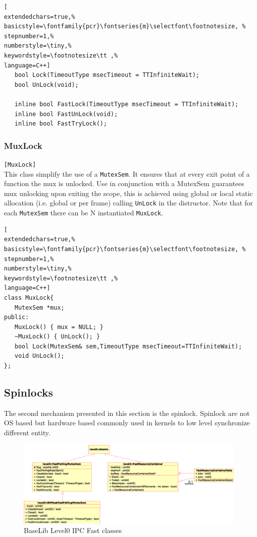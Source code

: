 \begin{lstlisting}[
extendedchars=true,%
basicstyle=\fontfamily{pcr}\fontseries{m}\selectfont\footnotesize, %
stepnumber=1,%
numberstyle=\tiny,%
keywordstyle=\footnotesize\tt ,%
language=C++]
   bool Lock(TimeoutType msecTimeout = TTInfiniteWait);
   bool UnLock(void);

   inline bool FastLock(TimeoutType msecTimeout = TTInfiniteWait);
   inline bool FastUnLock(void);
   inline bool FastTryLock();
\end{lstlisting}



\subsubsection{MuxLock}
\texttt{[MuxLock]}\\
This class simplify the use of a \texttt{MutexSem}. It ensures that at every exit point of a function the mux is unlocked.
Use in conjunction with a MutexSem guarantees mux unlocking upon exiting the scope, this is achieved using global or local static allocation (i.e. global or per frame) calling \texttt{UnLock} in the distructor.
Note that for each \texttt{MutexSem} there can be N instantiated \texttt{MuxLock}.

\begin{lstlisting}[
extendedchars=true,%
basicstyle=\fontfamily{pcr}\fontseries{m}\selectfont\footnotesize, %
stepnumber=1,%
numberstyle=\tiny,%
keywordstyle=\footnotesize\tt ,%
language=C++]
class MuxLock{
   MutexSem *mux;
public:
   MuxLock() { mux = NULL; }
   ~MuxLock() { UnLock(); }
   bool Lock(MutexSem& sem,TimeoutType msecTimeout=TTInfiniteWait);
   void UnLock();
};
\end{lstlisting}



\subsection{Spinlocks}
The second mechanism presented in this section is the spinlock. Spinlock are not OS based but hardware based commonly used in kernels to low level synchronize different entity.

\begin{figure}[h!]
 \begin{center}
  \includegraphics[width=\textwidth]{level0/level0-IPC-Fast.eps}
  \caption{BaseLib Level0 IPC Fast classes}
  \label{f:level0:ipc-fast}
 \end{center}
\end{figure}

